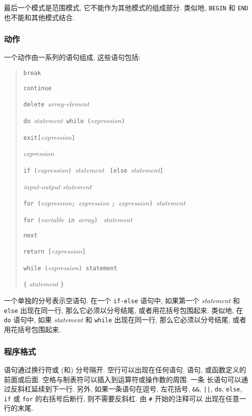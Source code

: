 最后一个模式是范围模式, 它不能作为其他模式的组成部分. 类似地,
\texttt{BEGIN} 和 \texttt{END} 也不能和其他模式结合.
\subsubsection{动作}
一个动作由一系列的语句组成, 这些语句包括:
\begin{quote}
    \texttt{break}

    \texttt{continue}

    \texttt{delete}\ \textit{array-element}

    \texttt{do}\ \textit{statement}\ \texttt{while}\
    \texttt{(}\textit{expression}\texttt{)}

    \texttt{exit[}\textit{expression}\texttt{]}

    \textit{expression}

    \texttt{if (}\textit{expression}\texttt{) }\textit{statement}
    \ \texttt{[else}\ \textit{statement}\texttt{]}

    \textit{input-output statement}

    \texttt{for (}\textit{expression}\texttt{; }\textit{expression}
    \texttt{; }\textit{expression}\texttt{) }\textit{statement}

    \texttt{for (}\textit{variable}\texttt{ in }\textit{array}\texttt{) }
    \textit{statement}

    \texttt{next}

    \texttt{return [}\textit{expression}\texttt{]}

    \texttt{while (}\textit{expression}\texttt{) statement}

    \verb'{' \textit{statement} \verb'}'
\end{quote}
一个单独的分号表示空语句. 在一个 \texttt{if-else} 语句中, 如果第一个 
\textit{statement} 和 \texttt{else} 出现在同一行, 那么它必须以分号结尾, 
或者用花括号包围起来. 类似地, 在 \texttt{do} 语句中, 如果
\textit{statement} 和 \texttt{while} 出现在同一行, 那么它必须以分号结尾,
或者用花括号包围起来.

\subsubsection{程序格式}
语句通过换行符或 (和) 分号隔开. 空行可以出现在任何语句, \patact 语句,
或函数定义的前面或后面. 空格与制表符可以插入到运算符或操作数的周围. 一条
长语句可以通过反斜杠延续到下一行. 另外, 如果一条语句在逗号, 左花括号,
\verb'&&', \verb'||', \texttt{do}, \texttt{else}, \texttt{if} 或 
\texttt{for} 的右括号后断行, 则不需要反斜杠. 由 \verb'#' 开始的注释可以
出现在任意一行的末尾.

